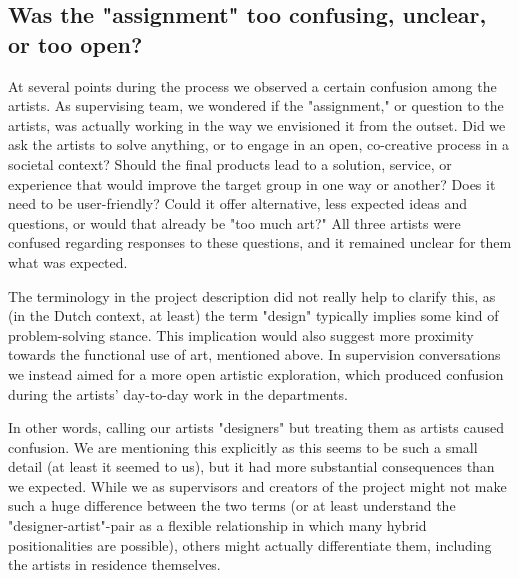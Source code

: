 \documentclass[authordate, empirical]{jote-new-article}
\begin{document}
	\subsection{Was the "assignment" too confusing, unclear, or too open?}



	At several points during the process we observed a certain confusion among the artists. As supervising team, we wondered if the "assignment," or question to the artists, was actually working in the way we envisioned it from the outset. Did we ask the artists to solve anything, or to engage in an open, co-creative process in a societal context? Should the final products lead to a solution, service, or experience that would improve the target group in one way or another? Does it need to be user-friendly? Could it offer alternative, less expected ideas and questions, or would that already be "too much art?" All three artists were confused regarding responses to these questions, and it remained unclear for them what was expected.







	The terminology in the project description did not really help to clarify this, as (in the Dutch context, at least) the term "design" typically implies some kind of problem-solving stance. This implication would also suggest more proximity towards the functional use of art, mentioned above. In supervision conversations we instead aimed for a more open artistic exploration, which produced confusion during the artists' day-to-day work in the departments.







	In other words, calling our artists "designers" but treating them as artists caused confusion. We are mentioning this explicitly as this seems to be such a small detail (at least it seemed to us), but it had more substantial consequences than we expected. While we as supervisors and creators of the project might not make such a huge difference between the two terms (or at least understand the "designer-artist"-pair as a flexible relationship in which many hybrid positionalities are possible), others might actually differentiate them, including the artists in residence themselves.
\end{document}
